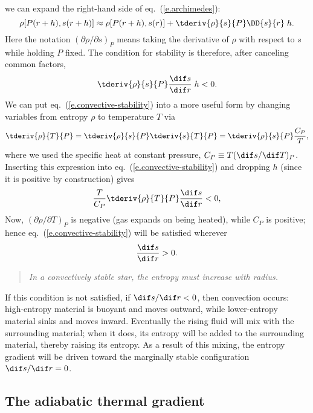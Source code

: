  we can expand the right-hand side of eq.~(\ref{e.archimedes}):
\[
	\rho[P(r+h),s(r+h)] \approx \rho[P(r+h),s(r)] + \tderiv{\rho}{s}{P}\DD{s}{r}\;h.
\]
Here the notation $(\partial \rho/\partial s)_{P}$ means taking the derivative of $\rho$ with respect to $s$ while holding $P$ fixed. The condition for stability is therefore, after canceling common factors,
\begin{equation}\label{e.convective-stability}
 \tderiv{\rho}{s}{P}\frac{\dif s}{\dif r} \;h < 0 .
\end{equation}
We can put eq.~(\ref{e.convective-stability}) into a more useful form by changing variables from entropy $\rho$ to temperature $T$ via
\[
\tderiv{\rho}{T}{P} = \tderiv{\rho}{s}{P}\tderiv{s}{T}{P} = \tderiv{\rho}{s}{P}\frac{C_{P}}{T},
\]
where we used the specific heat at constant pressure, $C_{P}\equiv T(\dif s/\dif T)_{P}$.
Inserting this expression into eq.~(\ref{e.convective-stability}) and dropping $h$ (since it is positive by construction) gives
\[
 \frac{T}{C_{P}}\tderiv{\rho}{T}{P}\frac{\dif s}{\dif r} < 0,
\]
Now, $(\partial \rho/\partial T)_{P}$ is negative (gas expands on being heated), while $C_{P}$ is positive; hence eq.~(\ref{e.convective-stability}) will be satisfied wherever
\begin{equation}\label{e.entropy-condition}
\frac{\dif s}{\dif r} > 0.
\end{equation}
\begin{quote}\itshape
In a convectively stable star, the entropy must increase with radius.
\end{quote}
If this condition is not satisfied, if $\dif s/\dif r < 0$, then convection occurs: high-entropy material is buoyant and moves outward, while lower-entropy material sinks and moves inward. Eventually the rising fluid will mix with the surrounding material; when it does, its entropy will be added to the surrounding material, thereby raising its entropy. As a result of this mixing, the entropy gradient will be driven toward the marginally stable configuration $\dif s/\dif r = 0$.

\subsection{The adiabatic thermal gradient}\label{s.adiabatic-gradient}


